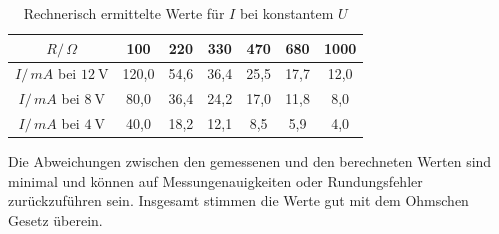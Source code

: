 \begin{table}[H]
\centering
\caption{Rechnerisch ermittelte Werte für $I$ bei konstantem $U$}
\begin{tabular}{ c c c c c c c } %
\toprule
    $R/\,\unit{\Omega}$ & 100 & 220 & 330 & 470 & 680 & 1000\\
     \midrule
    $I/\,\unit{mA}$ bei $\SI{12}{\V}$ & 120,0 & 54,6 & 36,4 & 25,5 & 17,7 & 12,0\\
    $I/\,\unit{mA}$ bei $\SI{8}{\V}$ & 80,0 & 36,4 & 24,2 & 17,0 & 11,8 & 8,0\\
    $I/\,\unit{mA}$ bei $\SI{4}{\V}$ & 40,0 & 18,2 & 12,1 & 8,5 & 5,9 & 4,0\\
    \bottomrule
\end{tabular}
\label{tab:K2T4}%
\end{table}

Die Abweichungen zwischen den gemessenen und den berechneten Werten sind minimal und können auf Messungenauigkeiten oder Rundungsfehler zurückzuführen sein. Insgesamt stimmen die Werte gut mit dem Ohmschen Gesetz überein.

\newpage
